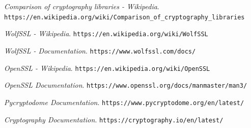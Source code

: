 \documentclass[11pt]{article}
\begin{document}
\vfill
\begin{thebibliography}{99}

{\em Comparison of cryptography libraries - Wikipedia}. \newline
  \verb|https://en.wikipedia.org/wiki/Comparison_of_cryptography_libraries|

{\em WolfSSL - Wikipedia}. \newline
  \verb|https://en.wikipedia.org/wiki/WolfSSL|

{\em WolfSSL - Documentation}. \newline
  \verb|https://www.wolfssl.com/docs/|

{\em OpenSSL - Wikipedia}. \newline
  \verb|https://en.wikipedia.org/wiki/OpenSSL|

{\em OpenSSL Documentation}. \newline
\verb|https://www.openssl.org/docs/manmaster/man3/|

{\em Pycryptodome Documentation}. \newline
\verb|https://www.pycryptodome.org/en/latest/|

{\em Cryptography Documentation}. \newline
\verb|https://cryptography.io/en/latest/|

\end{thebibliography}
\end{document}
